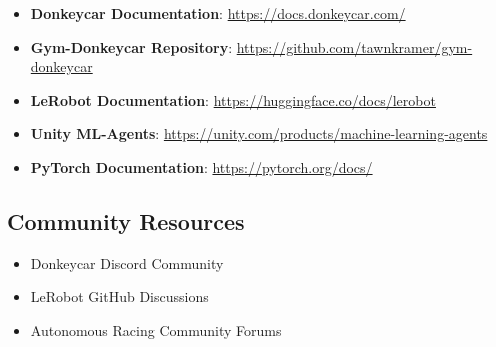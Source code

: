 \documentclass[11pt,a4paper]{article}
\begin{document}
\begin{itemize}
    \item \textbf{Donkeycar Documentation}: \url{https://docs.donkeycar.com/}
    \item \textbf{Gym-Donkeycar Repository}: \url{https://github.com/tawnkramer/gym-donkeycar}
    \item \textbf{LeRobot Documentation}: \url{https://huggingface.co/docs/lerobot}
    \item \textbf{Unity ML-Agents}: \url{https://unity.com/products/machine-learning-agents}
    \item \textbf{PyTorch Documentation}: \url{https://pytorch.org/docs/}
\end{itemize}

\subsection{Community Resources}

\begin{itemize}
    \item Donkeycar Discord Community
    \item LeRobot GitHub Discussions
    \item Autonomous Racing Community Forums
\end{itemize}
\end{document}
